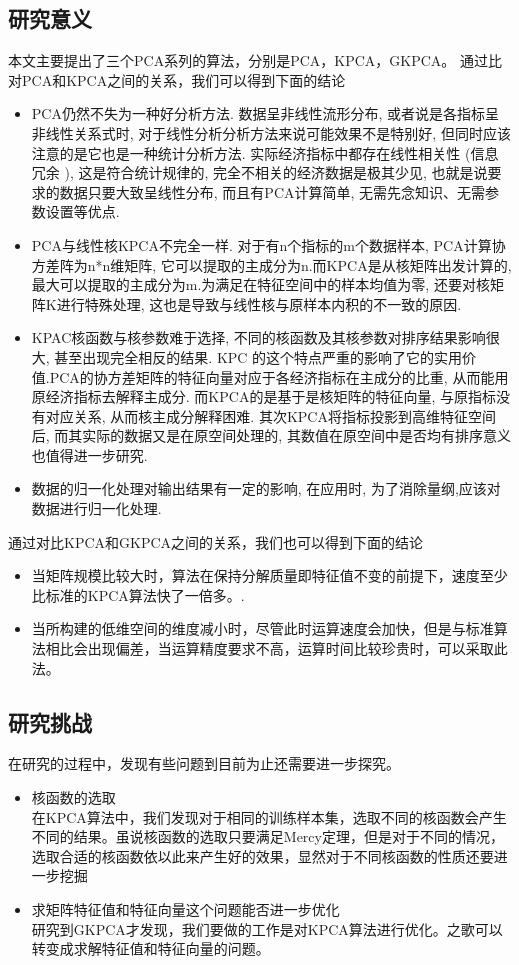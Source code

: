 \documentclass[10pt,a4paper]{article}
\begin{document}
\begin{CJK*}{UTF8}{song}
\subsection{研究意义}
本文主要提出了三个PCA系列的算法，分别是PCA，KPCA，GKPCA。
通过比对PCA和KPCA之间的关系，我们可以得到下面的结论
\begin{itemize}
\item PCA仍然不失为一种好分析方法. 数据呈非线性流形分布, 或者说是各指标呈非线性关系式时, 对于线性分析分析方法来说可能效果不是特别好, 但同时应该注意的是它也是一种统计分析方法. 实际经济指标中都存在线性相关性 (信息冗余 ), 这是符合统计规律的, 完全不相关的经济数据是极其少见, 也就是说要求的数据只要大致呈线性分布, 而且有PCA计算简单, 无需先念知识、无需参数设置等优点.
\item PCA与线性核KPCA不完全一样. 对于有n个指标的m个数据样本, PCA计算协方差阵为n*n维矩阵, 它可以提取的主成分为n.而KPCA是从核矩阵出发计算的, 最大可以提取的主成分为m.为满足在特征空间中的样本均值为零, 还要对核矩阵K进行特殊处理, 这也是导致与线性核与原样本内积的不一致的原因.
\item KPAC核函数与核参数难于选择, 不同的核函数及其核参数对排序结果影响很大, 甚至出现完全相反的结果. KPC 的这个特点严重的影响了它的实用价值.PCA的协方差矩阵的特征向量对应于各经济指标在主成分的比重, 从而能用原经济指标去解释主成分. 而KPCA的是基于是核矩阵的特征向量, 与原指标没有对应关系, 从而核主成分解释困难. 其次KPCA将指标投影到高维特征空间后, 而其实际的数据又是在原空间处理的, 其数值在原空间中是否均有排序意义也值得进一步研究.
\item 数据的归一化处理对输出结果有一定的影响, 在应用时, 为了消除量纲,应该对数据进行归一化处理.
\end{itemize}
通过对比KPCA和GKPCA之间的关系，我们也可以得到下面的结论
\begin{itemize}
\item 当矩阵规模比较大时，算法在保持分解质量即特征值不变的前提下，速度至少比标准的KPCA算法快了一倍多。.
\item 当所构建的低维空间的维度减小时，尽管此时运算速度会加快，但是与标准算法相比会出现偏差，当运算精度要求不高，运算时间比较珍贵时，可以采取此法。 
\end{itemize}


\subsection{研究挑战}
在研究的过程中，发现有些问题到目前为止还需要进一步探究。
\begin{itemize}
\item 核函数的选取\\
在KPCA算法中，我们发现对于相同的训练样本集，选取不同的核函数会产生不同的结果。虽说核函数的选取只要满足Mercy定理，但是对于不同的情况，选取合适的核函数依以此来产生好的效果，显然对于不同核函数的性质还要进一步挖掘
\item 求矩阵特征值和特征向量这个问题能否进一步优化\\
研究到GKPCA才发现，我们要做的工作是对KPCA算法进行优化。之歌可以转变成求解特征值和特征向量的问题。
\end{itemize}


\end{CJK*}
\end{document}
